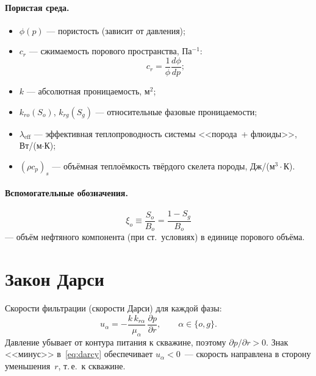 \documentclass[12pt,a4paper]{article}
\begin{document}
\paragraph{Пористая среда.}
\begin{itemize}[nosep]
  \item $\phi(p)$ --- пористость (зависит от давления);
  \item $c_r$ --- сжимаемость порового пространства, Па$^{-1}$:
        \begin{equation}\label{eq:cr}
          c_r = \frac{1}{\phi}\frac{d\phi}{dp};
        \end{equation}
  \item $k$ --- абсолютная проницаемость, м$^2$;
  \item $k_{ro}(S_o)$, $k_{rg}(S_g)$ --- относительные фазовые
        проницаемости;
  \item $\lambda_{\mathrm{eff}}$ --- эффективная теплопроводность
        системы <<порода~+ флюиды>>, Вт/(м$\cdot$К);
  \item $(\rho c_p)_s$ --- объёмная теплоёмкость твёрдого скелета породы,
        Дж/(м$^3\cdot$К).
\end{itemize}

\paragraph{Вспомогательные обозначения.}
\begin{equation}\label{eq:xi_o}
  \xi_o \equiv \frac{S_o}{B_o} = \frac{1 - S_g}{B_o}
\end{equation}
--- объём нефтяного компонента (при ст.~условиях) в единице порового объёма.


\section{Закон Дарси}\label{sec:darcy}

Скорости фильтрации (скорости Дарси) для каждой фазы:
\begin{equation}\label{eq:darcy}
  u_\alpha = -\frac{k\,k_{r\alpha}}{\mu_\alpha}\,
    \frac{\partial p}{\partial r}, \qquad \alpha \in \{o, g\}.
\end{equation}
Давление убывает от контура питания к скважине, поэтому
$\partial p/\partial r > 0$. Знак <<минус>> в~\eqref{eq:darcy}
обеспечивает $u_\alpha < 0$~--- скорость направлена в сторону
уменьшения~$r$, т.\,е.\ к скважине.
\end{document}
